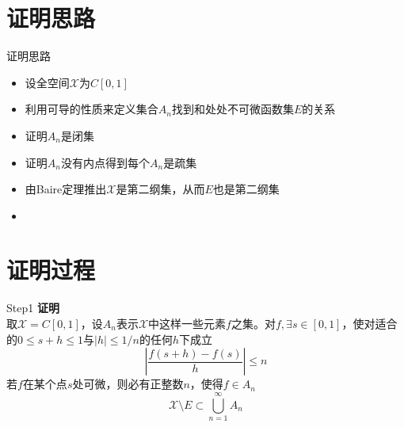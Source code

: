 \documentclass[10pt]{beamer}
\begin{document}
\section{证明思路}

\begin{frame}{证明思路}
	\begin{itemize}[<+- | alert@+>]
    \item 设全空间$\mathcal{X}$为$C[0,1]$
    \item 利用可导的性质来定义集合$A_n$找到和处处不可微函数集$E$的关系
    \item 证明$A_n$是闭集
    \item 证明$A_n$没有内点得到每个$A_n$是疏集
    \item 由Baire定理推出$\mathcal{X}$是第二纲集，从而$E$也是第二纲集
    \item
  \end{itemize}
\end{frame}

\section{证明过程}

\begin{frame}[fragile]{Step1}
\textbf{证明}\\
取$\mathcal{X}=C[0,1]$，设$A_n$表示$\mathcal{X}$中这样一些元素$f$之集。对$f,\exists s\in[0,1]$，使对适合的$0\leq s+h\leq 1$与$|h|\leq 1/n$的任何$h$下成立
\begin{equation}\label{}
  |\frac{f(s+h)-f(s)}{h}|\leq n
\end{equation}
若$f$在某个点$s$处可微，则必有正整数$n$，使得$f\in A_n$
\begin{equation}\label{236}
  \mathcal{X}\setminus E\subset \bigcup_{n=1}^{\infty}A_n
\end{equation}
\end{frame}
\end{document}
